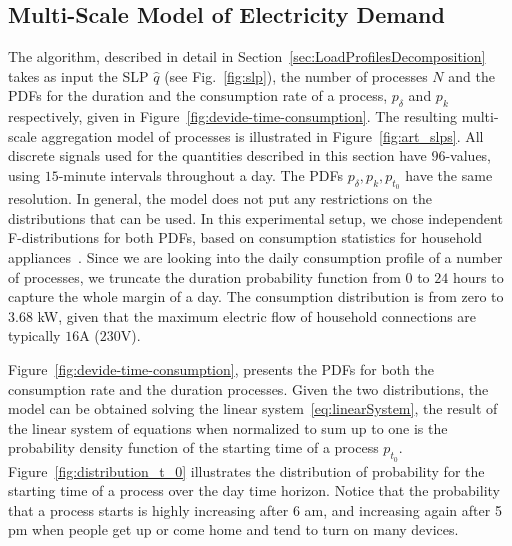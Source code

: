 \documentclass[conference]{IEEEtran}
\begin{document}
\subsection{Multi-Scale Model of Electricity Demand}
\label{sec:Results_Synthetic}

The algorithm, described in detail in Section~\ref{sec:LoadProfilesDecomposition} takes as input the SLP $\hat{q}$ (see Fig.~\ref{fig:slp}), the number of processes $N$ and the PDFs for the duration and the consumption rate of a process, $p_{\delta} $ and $p_k$ respectively, given in Figure~\ref{fig:devide-time-consumption}. The resulting multi-scale aggregation model of processes is illustrated in Figure~\ref{fig:art_slps}.
All discrete signals used for the quantities described in this section have $96$-values, using $15$-minute intervals throughout a day. The PDFs $p_{\delta}, p_k, p_{t_0}$ have the same resolution. In general, the model does not put any restrictions on the distributions that can be used. In this experimental setup, we chose independent F-distributions for both PDFs, based on consumption statistics for household appliances~\cite{zimmermann2012household}.
Since we are looking into the daily consumption profile of a number of processes, we truncate the duration probability function from $0$ to $24$ hours to capture the whole margin of a day. The consumption distribution is from zero to $3.68$ kW, given that the maximum electric flow of household connections are typically $16$A ($230$V).

Figure~\ref{fig:devide-time-consumption}, presents the PDFs for both the consumption rate and the duration processes. Given the two distributions, the model can be obtained solving the linear system~\eqref{eq:linearSystem}, the result of the linear system of equations when normalized to sum up to one is the probability density function of the starting time of a process $p_{t_0}$. Figure~\ref{fig:distribution_t_0} illustrates the distribution of probability for the starting time of a process over the day time horizon. Notice that the probability that a process starts is highly increasing after 6 am, and increasing again after 5 pm when people get up or come home and tend to turn on many devices.
\end{document}
